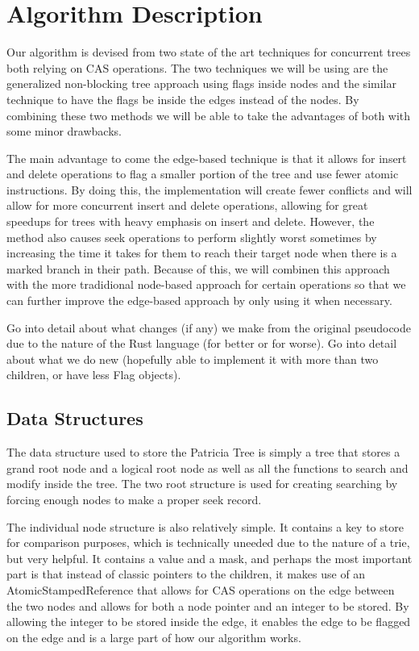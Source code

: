 \documentclass[conference]{IEEEtran}
\begin{document}
\section{Algorithm Description}
Our algorithm is devised from two state of the art techniques for concurrent trees both relying on CAS operations. The two techniques we will be using are the generalized non-blocking tree approach using flags inside nodes \cite{Shafiei2013,Brown2014} and the similar technique to have the flags be inside the edges instead of the nodes. \cite{Natarajan2014} By combining these two methods we will be able to take the advantages of both with some minor drawbacks.
\par
The main advantage to come the edge-based technique is that it allows for insert and delete operations to flag a smaller portion of the tree and use fewer atomic instructions. \cite{Natarajan2014} By doing this, the implementation will create fewer conflicts and will allow for more concurrent insert and delete operations, allowing for great speedups for trees with heavy emphasis on insert and delete. However, the method also causes seek operations to perform slightly worst sometimes by increasing the time it takes for them to reach their target node when there is a marked branch in their path. Because of this, we will combinen this approach with the more tradidional node-based approach for certain operations so that we can further improve the edge-based approach by only using it when necessary. 

Go into detail about what changes (if any) we make from the original pseudocode due to the nature of the Rust language (for better or for worse). Go into detail about what we do new (hopefully able to implement it with more than two children, or have less Flag objects).

\subsection{Data Structures}
The data structure used to store the Patricia Tree is simply a tree that stores a grand root node and a logical root node as well as all the functions to search and modify inside the tree. The two root structure is used for creating searching by forcing enough nodes to make a proper seek record.
\par
The individual node structure is also relatively simple. It contains a key to store for comparison purposes, which is technically uneeded due to the nature of a trie, but very helpful. It contains a value and a mask, and perhaps the most important part is that instead of classic pointers to the children, it makes use of an AtomicStampedReference that allows for CAS operations on the edge between the two nodes and allows for both a node pointer and an integer to be stored. By allowing the integer to be stored inside the edge, it enables the edge to be flagged on the edge and is a large part of how our algorithm works.
\end{document}
